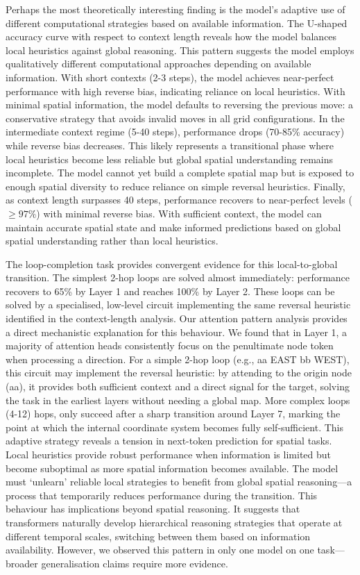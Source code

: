 Perhaps the most theoretically interesting finding is the model's adaptive use of different computational strategies based on available information. The U-shaped accuracy curve with respect to context length reveals how the model balances local heuristics against global reasoning. This pattern suggests the model employs qualitatively different computational approaches depending on available information. With short contexts (2-3 steps), the model achieves near-perfect performance with high reverse bias, indicating reliance on local heuristics. With minimal spatial information, the model defaults to reversing the previous move: a conservative strategy that avoids invalid moves in all grid configurations. In the intermediate context regime (5-40 steps), performance drops (70-85\% accuracy) while reverse bias decreases. This likely represents a transitional phase where local heuristics become less reliable but global spatial understanding remains incomplete. The model cannot yet build a complete spatial map but is exposed to enough spatial diversity to reduce reliance on simple reversal heuristics. Finally, as context length surpasses 40 steps, performance recovers to near-perfect levels ($\geq97\%$) with minimal reverse bias. With sufficient context, the model can maintain accurate spatial state and make informed predictions based on global spatial understanding rather than local heuristics. 

The loop-completion task provides convergent evidence for this local-to-global transition. The simplest 2-hop loops are solved almost immediately: performance recovers to 65\% by Layer 1 and reaches 100\% by Layer 2. These loops can be solved by a specialised, low-level circuit implementing the same reversal heuristic identified in the context-length analysis. Our attention pattern analysis provides a direct mechanistic explanation for this behaviour. We found that in Layer 1, a majority of attention heads consistently focus on the penultimate node token when processing a direction. For a simple 2-hop loop (e.g., aa EAST bb WEST), this circuit may implement the reversal heuristic: by attending to the origin node (aa), it provides both sufficient context and a direct signal for the target, solving the task in the earliest layers without needing a global map. More complex loops (4-12) hops, only succeed after a sharp transition around Layer 7, marking the point at which the internal coordinate system becomes fully self-sufficient. This adaptive strategy reveals a tension in next-token prediction for spatial tasks. Local heuristics provide robust performance when information is limited but become suboptimal as more spatial information becomes available. The model must `unlearn' reliable local strategies to benefit from global spatial reasoning—a process that temporarily reduces performance during the transition. This behaviour has implications beyond spatial reasoning. It suggests that transformers naturally develop hierarchical reasoning strategies that operate at different temporal scales, switching between them based on information availability. However, we observed this pattern in only one model on one task—broader generalisation claims require more evidence.

